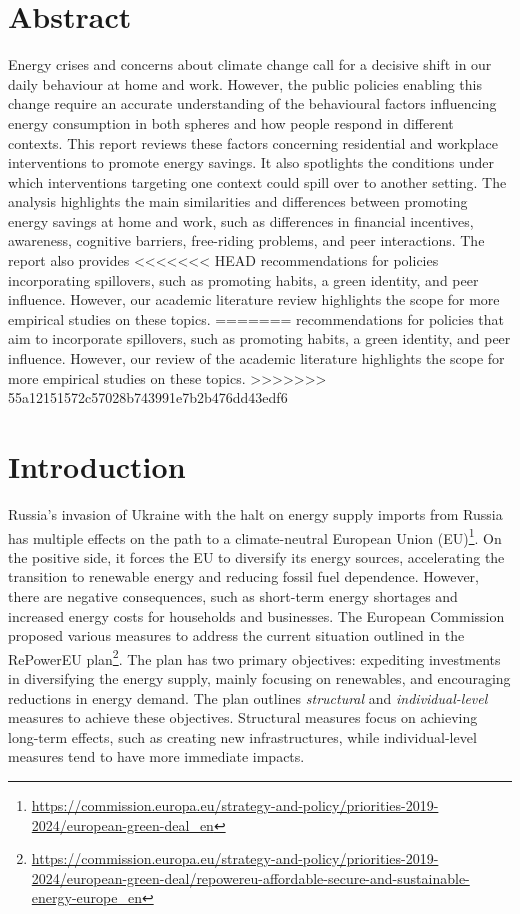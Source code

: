 \documentclass[
  12pt,
  captions=heading]{scrreport}
\DeclareRobustCommand{\href}[2]{#2\footnote{\url{#1}}}
\begin{document}
\clearpage

\hypertarget{abstract}{%
\chapter*{Abstract}\label{abstract}}

Energy crises and concerns about climate change call for a decisive
shift in our daily behaviour at home and work. However, the public
policies enabling this change require an accurate understanding of the
behavioural factors influencing energy consumption in both spheres and
how people respond in different contexts. This report reviews these
factors concerning residential and workplace interventions to promote
energy savings. It also spotlights the conditions under which
interventions targeting one context could spill over to another setting.
The analysis highlights the main similarities and differences between
promoting energy savings at home and work, such as differences in
financial incentives, awareness, cognitive barriers, free-riding
problems, and peer interactions. The report also provides
<<<<<<< HEAD
recommendations for policies incorporating spillovers, such as promoting
habits, a green identity, and peer influence. However, our academic
literature review highlights the scope for more empirical studies on
these topics.
=======
recommendations for policies that aim to incorporate spillovers, such as
promoting habits, a green identity, and peer influence. However, our
review of the academic literature highlights the scope for more
empirical studies on these topics.
>>>>>>> 55a12151572c57028b743991e7b2b476dd43edf6

\hypertarget{introduction}{%
\chapter{Introduction}\label{introduction}}

Russia's invasion of Ukraine with the halt on energy supply imports from
Russia has multiple effects on the path
\href{https://commission.europa.eu/strategy-and-policy/priorities-2019-2024/european-green-deal_en}{to
a climate-neutral European Union (EU)}. On the positive side, it forces
the EU to diversify its energy sources, accelerating the transition to
renewable energy and reducing fossil fuel dependence. However, there are
negative consequences, such as short-term energy shortages and increased
energy costs for households and businesses. The European Commission
proposed various measures to address the current situation outlined in
the
\href{https://commission.europa.eu/strategy-and-policy/priorities-2019-2024/european-green-deal/repowereu-affordable-secure-and-sustainable-energy-europe_en}{RePowerEU
plan}. The plan has two primary objectives: expediting investments in
diversifying the energy supply, mainly focusing on renewables, and
encouraging reductions in energy demand. The plan outlines
\emph{structural} and \emph{individual-level} measures to achieve these
objectives. Structural measures focus on achieving long-term effects,
such as creating new infrastructures, while individual-level measures
tend to have more immediate impacts.
\end{document}
